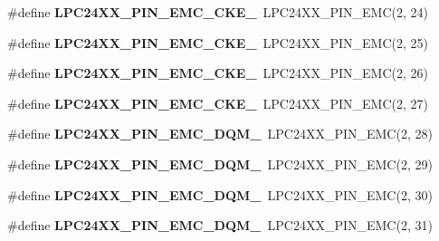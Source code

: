 \begin{DoxyCompactItemize}
\mbox{\label{group__lpc24xx__io_gabdd591a6258c445cd678d7cff3192916}} 
\#define {\bfseries L\+P\+C24\+X\+X\+\_\+\+P\+I\+N\+\_\+\+E\+M\+C\+\_\+\+C\+K\+E\+\_}~L\+P\+C24\+X\+X\+\_\+\+P\+I\+N\+\_\+\+E\+MC(2, 24)
\item 
\mbox{\label{group__lpc24xx__io_ga2ba03d2b0265659e69a93c40d76804d7}} 
\#define {\bfseries L\+P\+C24\+X\+X\+\_\+\+P\+I\+N\+\_\+\+E\+M\+C\+\_\+\+C\+K\+E\+\_}~L\+P\+C24\+X\+X\+\_\+\+P\+I\+N\+\_\+\+E\+MC(2, 25)
\item 
\mbox{\label{group__lpc24xx__io_ga4c407a52a9f9c53dbd1622e16cd45471}} 
\#define {\bfseries L\+P\+C24\+X\+X\+\_\+\+P\+I\+N\+\_\+\+E\+M\+C\+\_\+\+C\+K\+E\+\_}~L\+P\+C24\+X\+X\+\_\+\+P\+I\+N\+\_\+\+E\+MC(2, 26)
\item 
\mbox{\label{group__lpc24xx__io_gacf9d69113adabc750a4fe2fb10f411a1}} 
\#define {\bfseries L\+P\+C24\+X\+X\+\_\+\+P\+I\+N\+\_\+\+E\+M\+C\+\_\+\+C\+K\+E\+\_}~L\+P\+C24\+X\+X\+\_\+\+P\+I\+N\+\_\+\+E\+MC(2, 27)
\item 
\mbox{\label{group__lpc24xx__io_ga0b0854a067a4c3e82132c4e1ed24b3ba}} 
\#define {\bfseries L\+P\+C24\+X\+X\+\_\+\+P\+I\+N\+\_\+\+E\+M\+C\+\_\+\+D\+Q\+M\+\_}~L\+P\+C24\+X\+X\+\_\+\+P\+I\+N\+\_\+\+E\+MC(2, 28)
\item 
\mbox{\label{group__lpc24xx__io_gab67f3cd927dc4733dbcf4259f132b365}} 
\#define {\bfseries L\+P\+C24\+X\+X\+\_\+\+P\+I\+N\+\_\+\+E\+M\+C\+\_\+\+D\+Q\+M\+\_}~L\+P\+C24\+X\+X\+\_\+\+P\+I\+N\+\_\+\+E\+MC(2, 29)
\item 
\mbox{\label{group__lpc24xx__io_ga16f5c314ddcb243e3692ada7baa786d6}} 
\#define {\bfseries L\+P\+C24\+X\+X\+\_\+\+P\+I\+N\+\_\+\+E\+M\+C\+\_\+\+D\+Q\+M\+\_}~L\+P\+C24\+X\+X\+\_\+\+P\+I\+N\+\_\+\+E\+MC(2, 30)
\item 
\mbox{\label{group__lpc24xx__io_ga9ef9be76b5fb025780be0fe66952fec5}} 
\#define {\bfseries L\+P\+C24\+X\+X\+\_\+\+P\+I\+N\+\_\+\+E\+M\+C\+\_\+\+D\+Q\+M\+\_}~L\+P\+C24\+X\+X\+\_\+\+P\+I\+N\+\_\+\+E\+MC(2, 31)
\item 
\mbox{\label{group__lpc24xx__io_ga634f737ee932dd0134b163bfd4d6d60d}} 

\end{DoxyCompactItemize}
